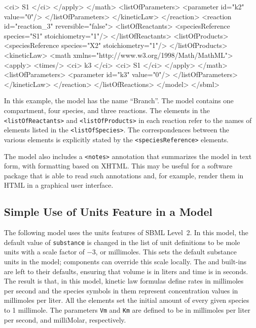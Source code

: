 \documentclass[10pt,twocolumntoc]{cekarticle}
\begin{document}
\begin{example}
                            <ci> S1 </ci>
                        </apply>
                    </math>
                    <listOfParameters>
                        <parameter id="k2" value="0"/>
                    </listOfParameters>
                </kineticLaw>
            </reaction>
            <reaction id="reaction_3" reversible="false">
                <listOfReactants>
                    <speciesReference species="S1" stoichiometry="1"/>
                </listOfReactants>
                <listOfProducts>
                    <speciesReference species="X2" stoichiometry="1"/>
                </listOfProducts>
                <kineticLaw>
                    <math xmlns="http://www.w3.org/1998/Math/MathML">
                        <apply>
                            <times/>
                            <ci> k3 </ci>
                            <ci> S1 </ci>
                        </apply>
                    </math>
                    <listOfParameters>
                        <parameter id="k3" value="0"/>
                    </listOfParameters>
                </kineticLaw>
            </reaction>
        </listOfReactions>
    </model>
</sbml>
\end{example}

In this example, the model has the name ``Branch''.  The model contains one
compartment, four species, and three reactions.  The elements in the
\texttt{<listOfReactants>} and \texttt{<listOfProducts>} in each reaction
refer to the names of elements listed in the \texttt{<listOfSpecies>}.  The
correspondences between the various elements is explicitly stated by the
\texttt{<speciesReference>} elements.

The model also includes a \texttt{<notes>} annotation that summarizes the
model in text form, with formatting based on XHTML.  This may be useful for
a software package that is able to read such annotations and, for example,
render them in HTML in a graphical user interface.


\subsection{Simple Use of Units Feature in a Model}
\label{apdx:units-eg}

The following model uses the units features of SBML Level~2.  In
this model, the default value of \texttt{substance} is changed in
the list of unit definitions to be mole units with a scale factor
of $-3$, or millimoles.  This sets the default substance units in
the model; components can override this scale locally.  The
 and  built-ins are left to their
defaults, ensuring that volume is in liters and time is in
seconds.  The result is that, in this model, kinetic law formulas
define rates in millimoles per second and the species symbols in
them represent concentration values in millimoles per liter.  All
the  elements set the initial amount of every given
species to 1 millimole.  The parameters \texttt{Vm} and
\texttt{Km} are defined to be in millimoles per liter per second,
and milliMolar, respectively.
\end{document}
